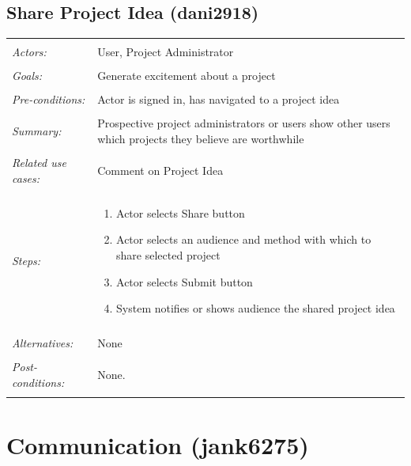 \documentclass[11pt]{report}
\begin{document}
\subsection{Share Project Idea (dani2918)}
\begin{tabular}{ p{2cm} p{12cm} }
 \hline
 \\
 \textit{Actors:} & User, Project Administrator \\ 
 \\
 \textit{Goals:} & Generate excitement about a project  \\
 \\
 \textit{Pre-conditions:} & Actor is signed in, has navigated to a project idea  \\
 \\
 \textit{Summary:} &  Prospective project administrators or users show other users which projects they believe are worthwhile \\ 
 \\
 \textit{Related use cases:} & Comment on Project Idea \\ 
 \\
 \textit{Steps:} & \begin{enumerate}
  \item Actor selects Share button
  \item Actor selects an audience and method with which to share selected project
  \item Actor selects Submit button
  \item System notifies or shows audience the shared project idea
 \end{enumerate} \\
 \\
 \textit{Alternatives:} & None \\
 \\
 \textit{Post-conditions:} & None. \\
 \\
\hline
\end{tabular}



\section{Communication (jank6275)}
\end{document}
